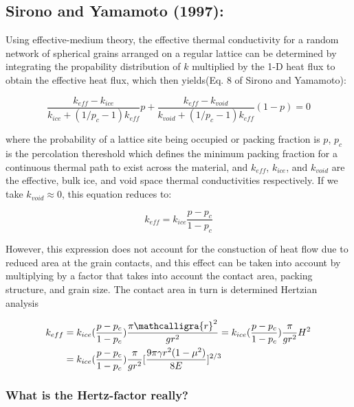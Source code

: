 \documentclass[11pt]{article} %
\newcommand{\sr}{\ensuremath{\mathcalligra{r}} \xspace}
\begin{document}
\subsection{Sirono and Yamamoto (1997):}

	Using effective-medium theory, the effective thermal conductivity for a random network of spherical grains arranged on a regular lattice can be determined by integrating the propability distribution of $k$ multiplied by the 1-D heat flux to obtain the effective heat flux, which then yields(Eq. 8 of Sirono and Yamamoto):
	
	 \begin{equation}
	 \frac{k_{eff} - k_{ice}}{k_{ice} +(1/p_{c}-1)k_{eff}}p + \frac{k_{eff}-k_{void}}{k_{void}+(1/p_{c}-1)k_{eff}}(1-p)=0
	 \end{equation}

	 where the probability of a lattice site being occupied or packing fraction is $p$, $p_{c}$  is the percolation thereshold which defines the minimum packing fraction for a continuous thermal path to exist across the material, and $k_{eff}$, $k_{ice}$, and $k_{void}$ are the effective, bulk ice, and void space thermal conductivities respectively. If we take $k_{void} \approx 0$, this equation reduces to:
	 
	 \begin{equation}
	 k_{eff} = k_{ice} \frac{p - p_{c}}{1 - p_{c}}
	 \end{equation}
	 
	 However, this expression does not account for the constuction of heat flow due to reduced area at the grain contacts, and this effect can be taken into account by multiplying by a factor that takes into account the contact area, packing structure, and grain size. The contact area in turn is determined Hertzian analysis
	 
	\begin{equation}
	\begin{split}
	k_{eff} &= k_{ice} ( \frac{p - p_{c}}{1-p_{c}} )\frac{\pi \sr^{2}}{g r^{2}} =  k_{ice} ( \frac{p - p_{c}}{1-p_{c}} )\frac{\pi}{g r^{2}} H^{2} \\
		 &= k_{ice} ( \frac{p - p_{c}}{1-p_{c}} )\frac{\pi}{g r^{2}}[ \frac{9 \pi \gamma r^{2} (1-\mu^{2})}{8 E} ]^{2/3}
	\end{split}
	\end{equation}

\subsubsection{What is the Hertz-factor really?}
\end{document}
